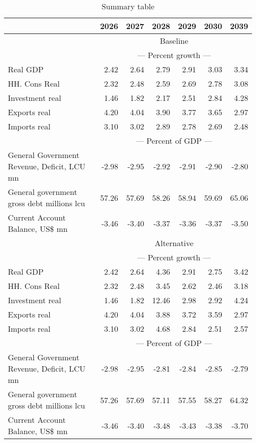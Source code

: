 \documentclass{article}
\begin{document}
\begin{table}[ht]
\caption*{Summary table}
\begin{tabular}{lrrrrr|r}
\toprule
 & 2026 & 2027 & 2028 & 2029 & 2030 & 2039 \\
\midrule
&\multicolumn{6}{c}{{Baseline}}                               \\
&\multicolumn{6}{c}{{--- Percent growth ---}}                               \\
Real GDP & 2.42 & 2.64 & 2.79 & 2.91 & 3.03 & 3.34 \\
HH. Cons Real & 2.32 & 2.48 & 2.59 & 2.69 & 2.78 & 3.08 \\
Investment real & 1.46 & 1.82 & 2.17 & 2.51 & 2.84 & 4.28 \\
Exports real & 4.20 & 4.04 & 3.90 & 3.77 & 3.65 & 2.97 \\
Imports real & 3.10 & 3.02 & 2.89 & 2.78 & 2.69 & 2.48 \\
&\multicolumn{6}{c}{{--- Percent of GDP ---}}                               \\
General Government Revenue, Deficit, LCU mn & -2.98 & -2.95 & -2.92 & -2.91 & -2.90 & -2.80 \\
General government gross debt millions lcu & 57.26 & 57.69 & 58.26 & 58.94 & 59.69 & 65.06 \\
Current Account Balance, US\$ mn & -3.46 & -3.40 & -3.37 & -3.36 & -3.37 & -3.50 \\
&\multicolumn{6}{c}{{Alternative}}                               \\
&\multicolumn{6}{c}{{--- Percent growth ---}}                               \\
Real GDP & 2.42 & 2.64 & 4.36 & 2.91 & 2.75 & 3.42 \\
HH. Cons Real & 2.32 & 2.48 & 3.45 & 2.62 & 2.46 & 3.18 \\
Investment real & 1.46 & 1.82 & 12.46 & 2.98 & 2.92 & 4.24 \\
Exports real & 4.20 & 4.04 & 3.88 & 3.72 & 3.59 & 2.97 \\
Imports real & 3.10 & 3.02 & 4.68 & 2.84 & 2.51 & 2.57 \\
&\multicolumn{6}{c}{{--- Percent of GDP ---}}                               \\
General Government Revenue, Deficit, LCU mn & -2.98 & -2.95 & -2.81 & -2.84 & -2.85 & -2.79 \\
General government gross debt millions lcu & 57.26 & 57.69 & 57.11 & 57.55 & 58.27 & 64.32 \\
Current Account Balance, US\$ mn & -3.46 & -3.40 & -3.48 & -3.43 & -3.38 & -3.70 \\

\end{tabular}
\end{table}
\end{document}
